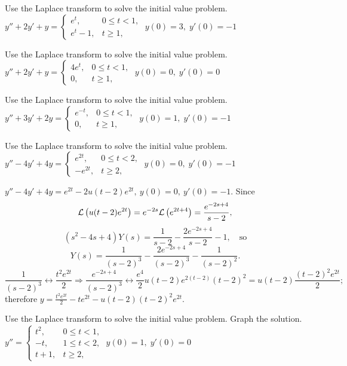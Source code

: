 \documentclass{ximera}
\begin{document}
\begin{problem}\label{exer:8.5.15} Use the Laplace transform to solve the initial value problem.
$y''+2y'+y=\left\{\begin{array}{cl}
e^t,&0\le t<1,\\e^t-1,&t\ge 1,\end{array}\right.\;  y(0)=3,\;
y'(0)=-1$
\end{problem}

\begin{problem}\label{exer:8.5.16}
Use the Laplace transform to solve the initial value problem.
$y''+2y'+y=\left\{\begin{array}{cl}
4e^t,&0\le t<1,\\0,&t\ge 1,\end{array}\right.\;  y(0)=0,\;
y'(0)=0$
\end{problem}

\begin{problem}\label{exer:8.5.17} Use the Laplace transform to solve the initial value problem.
$y''+3y'+2y=\left\{\begin{array}{cl}
e^{-t},&0\le t<1,\\0,&t\ge 1,\end{array}\right.\;  y(0)=1,\;  y'(0)=-1$
\end{problem}

\begin{problem}\label{exer:8.5.18} Use the Laplace transform to solve the initial value problem.
$y''-4y'+4y=\left\{\begin{array}{rl}
e^{2t},&0\le t<2,\\-e^{2t},&t\ge 2,\end{array}\right.\;  y(0)=0,\;
y'(0)=-1$

\begin{solution}
$y''-4y'+4y=e^{2t}-2u(t-2)e^{2t},\ y(0)=0,\ y'(0)=-1$.
Since
$$
{\cal L}\left(u(t-2)e^{2t}\right)=e^{-2s}{\cal
L}\left(e^{2t+4}\right)=\frac{e^{-2s+4}}{s-2},
$$
$$
(s^2-4s+4)Y(s)=\frac{1}{s-2}-\frac{2e^{-2s+4}}{s-2}-1,\quad\mbox{so}
$$
$$
Y(s)=\frac{1}{(s-2)^3}-\frac{2e^{-2s+4}}{(s-2)^3}-\frac{1}{(s-2)^2}.
$$
$$
\frac{1}{(s-2)^3}\leftrightarrow \frac{t^2e^{2t}}{2}\Rightarrow
\frac{e^{-2s+4}}{(s-2)^3}\leftrightarrow\frac{e^4}{2}u(t-2)e^{2(t-2)}(t-2)^2
=u(t-2)\frac{(t-2)^2e^{2t}}{2};
$$
therefore
$y=\frac{t^2e^{2t}}{2}-te^{2t}-u(t-2)(t-2)^2e^{2t}$.
\end{solution}
\end{problem}

\begin{problem}\label{exer:8.5.19} Use the Laplace transform to solve the initial value problem.  Graph the solution. 
$y''=\left\{\begin{array}{cl}t^2,&0\le
t<1,\\-t,&1\le t<2,\\t+1,&t\ge 2,\end{array}\right.\;  y(0)=1,\;
y'(0)=0$
\end{problem}
\end{document}
